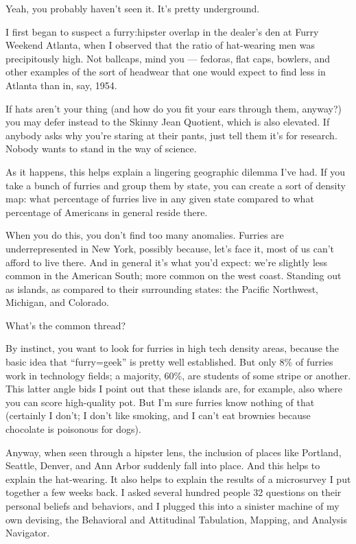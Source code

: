 
Yeah, you probably haven't seen it. It's pretty underground.

I first began to suspect a furry:hipster overlap in the dealer's den at Furry Weekend Atlanta, when I observed that the ratio of hat-wearing men was precipitously high. Not ballcaps, mind you — fedoras, flat caps, bowlers, and other examples of the sort of headwear that one would expect to find less in Atlanta than in, say, 1954.

If hats aren't your thing (and how do you fit your ears through them, anyway?) you may defer instead to the Skinny Jean Quotient, which is also elevated. If anybody asks why you're staring at their pants, just tell them it's for research. Nobody wants to stand in the way of science.

As it happens, this helps explain a lingering geographic dilemma I've had. If you take a bunch of furries and group them by state, you can create a sort of density map: what percentage of furries live in any given state compared to what percentage of Americans in general reside there.

When you do this, you don't find too many anomalies. Furries are underrepresented in New York, possibly because, let's face it, most of us can't afford to live there. And in general it's what you'd expect: we're slightly less common in the American South; more common on the west coast. Standing out as islands, as compared to their surrounding states: the Pacific Northwest, Michigan, and Colorado.

What's the common thread?

By instinct, you want to look for furries in high tech density areas, because the basic idea that ``furry=geek'' is pretty well established. But only 8\% of furries work in technology fields; a majority, 60\%, are students of some stripe or another. This latter angle bids I point out that these islands are, for example, also where you can score high-quality pot. But I'm sure furries know nothing of that (certainly I don't; I don't like smoking, and I can't eat brownies because chocolate is poisonous for dogs).

Anyway, when seen through a hipster lens, the inclusion of places like Portland, Seattle, Denver, and Ann Arbor suddenly fall into place. And this helps to explain the hat-wearing. It also helps to explain the results of a microsurvey I put together a few weeks back. I asked several hundred people 32 questions on their personal beliefs and behaviors, and I plugged this into a sinister machine of my own devising, the Behavioral and Attitudinal Tabulation, Mapping, and Analysis Navigator.

